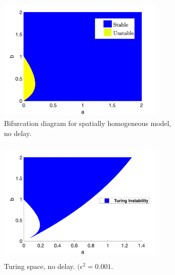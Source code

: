\begin{figure}[H]
    \centering
    \begin{subfigure}[b]{0.45\textwidth}
        \centering
        \includegraphics[width=8cm,height = 6cm]{bifsh.png}
        \caption{Bifurcation diagram for spatially homogeneous model, no delay.}
        \label{fig:bifsh}
    \end{subfigure}
    \hfill
    \begin{subfigure}[b]{0.45\textwidth}
        \centering
        \includegraphics[width=8cm,height = 6cm]{turingspace.png}
        \caption{Turing space, no delay. $(\epsilon^2=0.001$.}
        \label{fig:turingspace}
    \end{subfigure}
    \caption{}
    \label{fig:dispfixed}
\end{figure}

